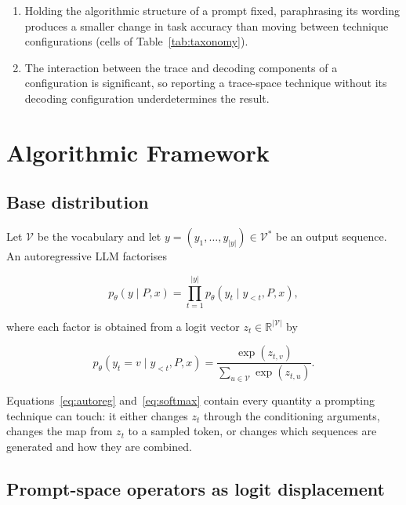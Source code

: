 \documentclass[conference]{IEEEtran}
\begin{document}
\begin{enumerate}
    \item[H1] Holding the algorithmic structure of a prompt fixed, paraphrasing its wording produces a smaller change in task accuracy than moving between technique configurations (cells of Table~\ref{tab:taxonomy}).
    \item[H2] The interaction between the trace and decoding components of a configuration is significant, so reporting a trace-space technique without its decoding configuration underdetermines the result.
\end{enumerate}

\section{Algorithmic Framework}
\label{sec:framework}

\subsection{Base distribution}
\label{sec:base-dist}

Let $\mathcal{V}$ be the vocabulary and let $y = (y_1, \ldots, y_{|y|}) \in \mathcal{V}^*$ be an output sequence. An autoregressive LLM factorises

\begin{equation}
p_\theta(y \mid P, x) = \prod_{t=1}^{|y|} p_\theta(y_t \mid y_{<t}, P, x),
\label{eq:autoreg}
\end{equation}

where each factor is obtained from a logit vector $z_t \in \mathbb{R}^{|\mathcal{V}|}$ by

\begin{equation}
p_\theta(y_t = v \mid y_{<t}, P, x) = \frac{\exp(z_{t,v})}{\sum_{u \in \mathcal{V}} \exp(z_{t,u})}.
\label{eq:softmax}
\end{equation}

Equations~\eqref{eq:autoreg} and~\eqref{eq:softmax} contain every
quantity a prompting technique can touch: it either changes $z_{t}$
through the conditioning arguments, changes the map from $z_{t}$ to a
sampled token, or changes which sequences are generated and how they
are combined.

\subsection{Prompt-space operators as logit displacement}
\label{sec:prompt-operators}
\end{document}
